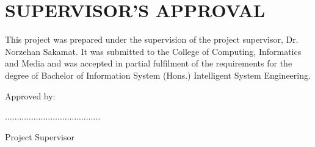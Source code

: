 \chapter{SUPERVISOR'S APPROVAL}

\makeatletter
% 
\noindent This project was prepared under the supervision of the project supervisor, Dr. Norzehan Sakamat. It was submitted to the College of Computing, Informatics and Media and was accepted in partial fulfilment of the requirements for the degree of Bachelor of Information System (Hons.) Intelligent System Engineering.\par
\vspace{2cm}\par
\noindent Approved by:\par
\vspace{2cm}\par
\noindent.$\dots\dots\dots\dots\dots\dots\dots\dots\dots\dots\dots\dots\dots$\par
\noindent{\@supervisor}\par
\noindent Project Supervisor\par
\vspace{1cm}
\noindent\@datesubmit 
\makeatother

